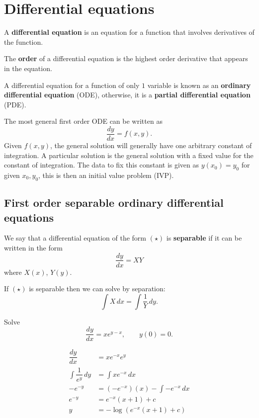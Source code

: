 \chapter{Differential equations}

\begin{definition}
    A \textbf{differential equation} is an equation for a function that involves derivatives of the function.
\end{definition}

\begin{definition}
    The \textbf{order} of a differential equation is the highest order derivative that appears in the equation.
\end{definition}

\begin{definition}
    A differential equation for a function of only $1$ variable is known as an \textbf{ordinary differential equation} (ODE), otherwise, it is a \textbf{partial differential equation} (PDE).
\end{definition}
    
The most general first order ODE can be written as \[\dfrac{dy}{dx}=f(x,y)\tag{$\star$}.\] Given $f(x,y)$, the general solution will generally have one arbitrary constant of integration. A particular solution is the general solution with a fixed value for the constant of integration. The data to fix this constant is given as $y(x_0)=y_0$ for given $x_0,y_0$, this is then an initial value problem (IVP).

\section{First order separable ordinary differential equations}

\begin{definition}
    We say that a differential equation of the form $(\star)$ is \textbf{separable} if it can be written in the form \[\dfrac{dy}{dx}=XY\] where $X(x)$, $Y(y)$.
\end{definition}

If $(\star)$ is separable then we can solve by separation: \[\int X\,dx=\int\dfrac1Y\,dy.\]

\begin{example}
    Solve \[\dfrac{dy}{dx}=xe^{y-x},\qquad y(0)=0.\]
    
    \begin{align*}
        \dfrac{dy}{dx}&=xe^{-x}e^y\\
        \int\dfrac1{e^y}\,dy&=\int xe^{-x}\,dx\\
        -e^{-y}&=(-e^{-x})(x)-\int -e^{-x}\,dx\\
        e^{-y}&=e^{-x}(x+1)+c\\
        y&=-\log{(e^{-x}(x+1)+c)}
    \end{align*}
\end{example}

